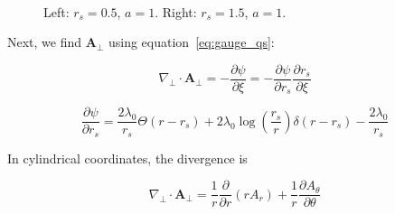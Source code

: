 \documentclass[aps,prl,preprint,groupedaddress]{revtex4-1}
\begin{document}
\begin{figure}
\centering
\mbox{\quad
{}}
\caption{Left: $r_s = 0.5$, $a=1$. Right: $r_s = 1.5$, $a=1$.} \label{fig12}
\end{figure}

Next, we find $\mathbf{A}_{\perp}$ using equation~\ref{eq:gauge_qs}:

\begin{equation}\label{eq:a_perp}
\nabla_\perp \cdot \mathbf{A}_\perp = -\frac{\partial \psi}{\partial \xi} = - \frac{\partial \psi}{\partial r_s}\frac{\partial r_s}{\partial \xi}
\end{equation}

\begin{equation}\label{eq:dpsi}
\frac{\partial \psi}{\partial r_s} = \frac{2\lambda_0}{r_s}\Theta(r-r_s) + 2\lambda_0 \log\left(\frac{r_s}{r}\right)\delta(r-r_s) - \frac{2\lambda_0}{r_s} 
\end{equation}


In cylindrical coordinates, the divergence is

\begin{equation}\label{eq:a_perp_cyl}
\nabla_\perp \cdot \mathbf{A}_\perp = \frac{1}{r}\frac{\partial}{\partial r} (r A_r) + \frac{1}{r}\frac{\partial A_{\theta}}{\partial \theta}
\end{equation}
\end{document}
